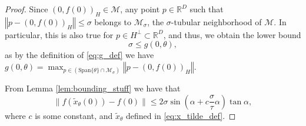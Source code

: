 \documentclass[12pt]{article}
\theoremstyle{remark}
\newcommand{\RR}{\mathbb{R}}
\newcommand{\MM}{\mathcal{M}}
\newcommand{\norm}[1]{\left\Vert #1 \right\Vert}
\newcommand{\wtilde}[1]{\widetilde{#1}}
\begin{document}
\begin{appendices}
\begin{proof}
    
    Since $(0,f(0))_H \in \MM$, any point $p\in \RR^D$ such that $\norm{p - (0,f(0))_H}\leq\sigma$ belongs to $\MM_\sigma$, the $\sigma$-tubular neighborhood of $\MM$. 
    In particular, this is also true for $p\in H^\perp\subset \RR^D$, and thus, we obtain the lower bound 
    \begin{equation*}
     \sigma \leq g(0,\theta)   
    ,\end{equation*}
    as by the definition of \eqref{eq:g_def} we have $g(0,\theta) = \max_{p\in (\textrm{Span}\{\theta\}\cap\MM_\sigma)} \norm{p - (0, f(0))_H}$.
    
    From Lemma \ref{lem:bounding_stuff} we have that 
    \[
    \|f(\wtilde{x}_\theta(0)) - f(0)\| \leq 2\sigma \sin (\alpha + c\frac{\sigma}{\tau}\alpha) \tan \alpha,
    \]
    where $c$ is some constant, and $\wtilde{x}_\theta$ defined in \eqref{eq:x_tilde_def}.
    

\end{proof}
\end{appendices}
\end{document}
